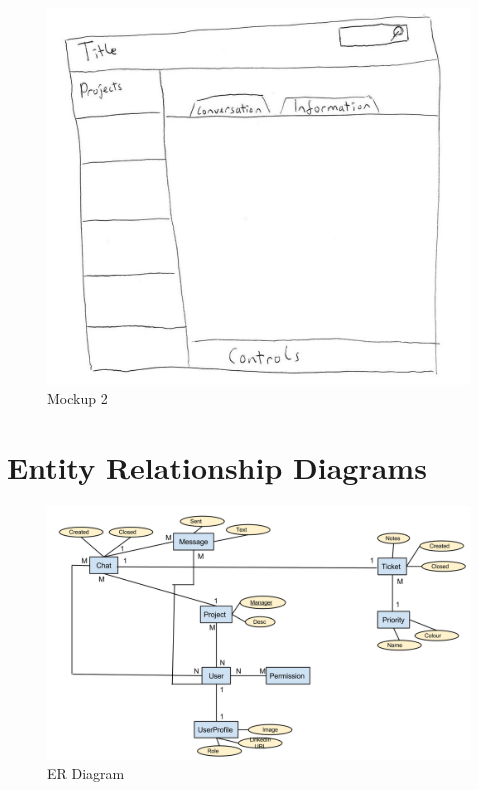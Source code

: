 \documentclass[a4paper]{l3proj}
\begin{document}
\begin{figure}
\includegraphics[scale=0.3]{mockup2}
\caption{Mockup 2}
\end{figure}


\section{Entity Relationship Diagrams}

\begin{figure}
\includegraphics[scale=0.4]{ER_Diagram}
\caption{ER Diagram}
\end{figure}
\end{document}
